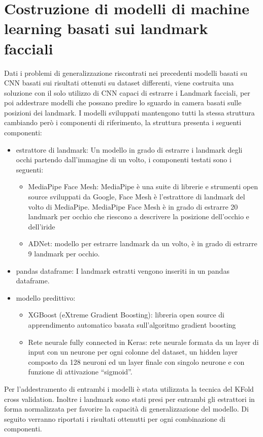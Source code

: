 \documentclass[12pt,a4paper,openright,twoside]{book}
\begin{document}
\section{Costruzione di modelli di machine learning basati sui landmark facciali}
\label{chap:landmark_based_model}
Dati i problemi di generalizzazione riscontrati nei precedenti modelli basati su CNN basati sui risultati ottenuti su dataset differenti, viene costruita una soluzione con il solo utilizzo di CNN capaci di estrarre i Landmark facciali, per poi addestrare modelli che possano predire lo sguardo in camera basati sulle posizioni dei landmark.
I modelli sviluppati mantengono tutti la stessa struttura cambiando però i componenti di riferimento, la struttura presenta i seguenti componenti: \begin{itemize}
    \item estrattore di landmark: Un modello in grado di estrarre i landmark degli occhi partendo dall'immagine di un volto, i componenti testati sono i seguenti: \begin{itemize}
        \item MediaPipe Face Mesh: MediaPipe è una suite di librerie e strumenti open source sviluppati da Google, Face Mesh è l'estrattore di landmark del volto di MediaPipe. MediaPipe Face Mesh è in grado di estrarre 20 landmark per occhio che riescono a descrivere la posizione dell'occhio e dell'iride
        \item ADNet: modello per estrarre landmark da un volto, è in grado di estrarre 9 landmark per occhio.
    \end{itemize}
    \item pandas dataframe: I landmark estratti vengono inseriti in un pandas dataframe.
    \item modello predittivo: \begin{itemize}
        \item XGBoost (eXtreme Gradient Boosting): libreria open source di apprendimento automatico basata sull'algoritmo gradient boosting
        \item Rete neurale fully connected in Keras: rete neurale formata da un layer di input con un neurone per ogni colonne del dataset, un hidden layer composto da 128 neuroni ed un layer finale con singolo neurone e con funzione di attivazione ``sigmoid''.
    \end{itemize}
\end{itemize}
Per l'addestramento di entrambi i modelli è stata utilizzata la tecnica del KFold cross validation. Inoltre i landmark sono stati presi per entrambi gli estrattori in forma normalizzata per favorire la capacità di generalizzazione del modello. Di seguito verranno riportati i risultati ottenutti per ogni combinazione di componenti.
\end{document}
